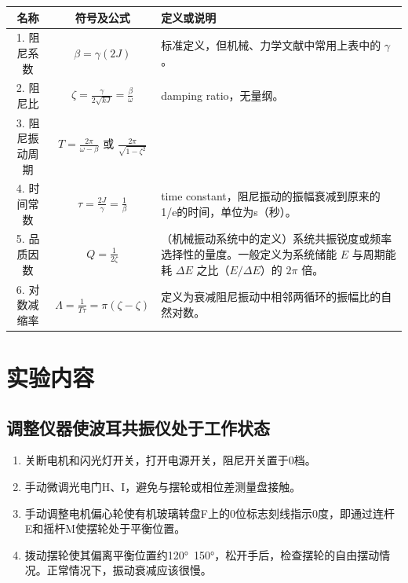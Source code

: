 \documentclass[12pt,a4paper]{amsart}
\begin{document}
\begin{center}
    \begin{tabular}{|c|c|p{6cm}|}
        \hline
        名称            & 符号及公式                                                             & 定义或说明                                                                                                                              \\
        \hline
        1. 阻尼系数     & $\beta = \gamma (2J)$                                                  & 标准定义，但机械、力学文献中常用上表中的 $\gamma$。                                                                                     \\
        2. 阻尼比       & $\zeta = \frac{\gamma}{2 \sqrt{kJ}} = \frac{\beta}{\omega}$            & damping ratio，无量纲。                                                                                                                 \\
        3. 阻尼振动周期 & $T = \frac{2\pi}{\omega - \beta}$ 或 $\frac{2\pi}{\sqrt{1 - \zeta^2}}$ &                                                                                                                                         \\
        4. 时间常数     & $\tau = \frac{2J}{\gamma} = \frac{1}{\beta}$                           & time constant，阻尼振动的振幅衰减到原来的1/e的时间，单位为s（秒）。                                                                     \\
        5. 品质因数     & $Q = \frac{1}{2\zeta}$                                                 & （机械振动系统中的定义）系统共振锐度或频率选择性的量度。一般定义为系统储能 $E$ 与周期能耗 $\Delta E$ 之比（$E/\Delta E$）的 $2\pi$ 倍。 \\
        6. 对数减缩率   & $\Lambda = \frac{1}{T\tau} = \pi(\zeta - \zeta)$                       & 定义为衰减阻尼振动中相邻两循环的振幅比的自然对数。                                                                                      \\
        \hline
    \end{tabular}
\end{center}

\section{实验内容}

\subsection{调整仪器使波耳共振仪处于工作状态}
\begin{enumerate}
    \item 关断电机和闪光灯开关，打开电源开关，阻尼开关置于0档。
    \item 手动微调光电门H、I，避免与摆轮或相位差测量盘接触。
    \item 手动调整电机偏心轮使有机玻璃转盘F上的0位标志刻线指示0度，即通过连杆E和摇杆M使摆轮处于平衡位置。
    \item 拨动摆轮使其偏离平衡位置约120°~150°，松开手后，检查摆轮的自由摆动情况。正常情况下，振动衰减应该很慢。
\end{enumerate}
\end{document}
